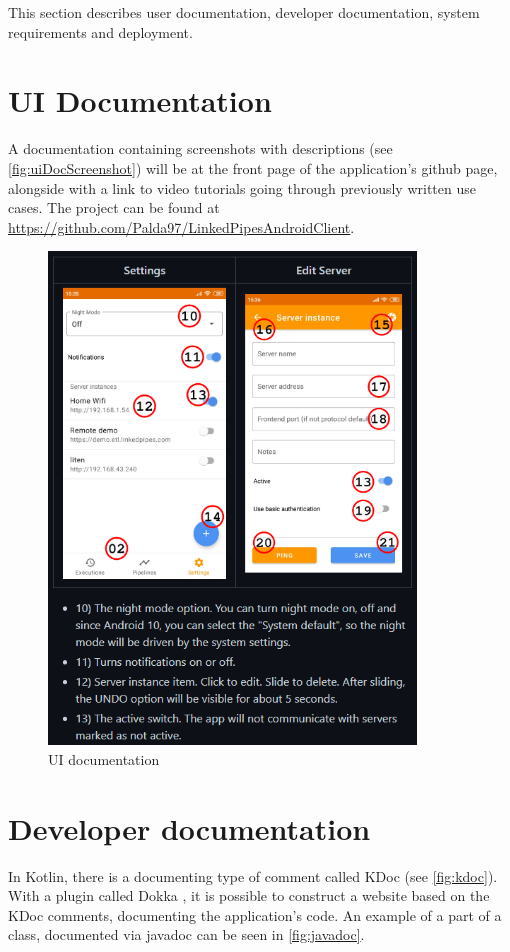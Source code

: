 This section describes user documentation, developer documentation, system requirements and deployment.

\section{UI Documentation}
A documentation containing screenshots with descriptions (see \autoref{fig:uiDocScreenshot}) will be at the front page of the application's github page, alongside with a link to video tutorials going through previously written use cases.
The project can be found at \url{https://github.com/Palda97/LinkedPipesAndroidClient}.

\begin{figure}\centering
	\includegraphics[width=0.87\textwidth]{pics/uiDocScreenshot.png}
	\caption[UI documentation]{UI documentation}\label{fig:uiDocScreenshot}
\end{figure}

\section{Developer documentation}
In Kotlin, there is a documenting type of comment called KDoc (see \autoref{fig:kdoc}).
With a plugin called Dokka \cite{dokka}, it is possible to construct a website based on the KDoc comments, documenting the application's code.
An example of a part of a class, documented via javadoc can be seen in \autoref{fig:javadoc}.

